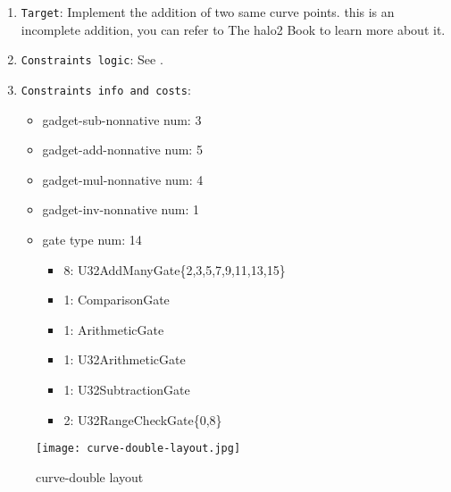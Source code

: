 
\begin{enumerate}
    \item \verb|Target|: Implement the addition of two same curve points. this is an incomplete addition, you can refer to The halo2 Book \cite{website:halo2-book} to learn more about it.
    \item \verb|Constraints logic|: See .
    \item \verb|Constraints info and costs|:
    \begin{itemize}
        \item gadget-sub-nonnative num: 3
        \item gadget-add-nonnative num: 5
        \item gadget-mul-nonnative num: 4
        \item gadget-inv-nonnative num: 1
        \item gate type num: 14
            \begin{itemize}
                \item 8: U32AddManyGate\{2,3,5,7,9,11,13,15\}
                \item 1: ComparisonGate
                \item 1: ArithmeticGate
                \item 1: U32ArithmeticGate
                \item 1: U32SubtractionGate
                \item 2: U32RangeCheckGate\{0,8\}
            \end{itemize}
    \end{itemize}
\end{enumerate}

\begin{figure}[!ht]
    \centering
    \texttt{[image: curve-double-layout.jpg]}
    \caption{curve-double layout}
    \label{fig:curve-double-layout}
\end{figure}
